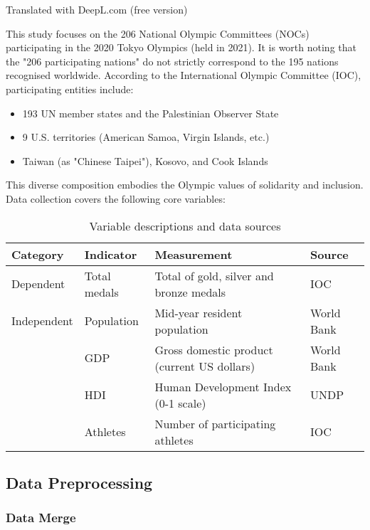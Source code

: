 \documentclass[11pt,twoside]{article}
\numberwithin{Theorem}{section}
\numberwithin{Definition}{section}
\numberwithin{Lemma}{section}
\numberwithin{Algorithm}{section}
\numberwithin{equation}{section}
\begin{document}
Translated with DeepL.com (free version)

This study focuses on the 206 National Olympic Committees (NOCs) participating in the 2020 Tokyo Olympics (held in 2021). It is worth noting that the "206 participating nations" do not strictly correspond to the 195 nations recognised worldwide. According to the International Olympic Committee (IOC), participating entities include:

\begin{itemize}
    \item 193 UN member states and the Palestinian Observer State
    \item 9 U.S. territories (American Samoa, Virgin Islands, etc.)
    \item Taiwan (as "Chinese Taipei"), Kosovo, and Cook Islands
\end{itemize}

This diverse composition embodies the Olympic values of solidarity and inclusion. Data collection covers the following core variables:

\begin{table}[!ht]
\centering
\caption{Variable descriptions and data sources}
\label{tab:variables}
\begin{tabular}{llll}
\toprule
\textbf{Category} & \textbf{Indicator} & \textbf{Measurement}  & \textbf{Source} \\
\midrule
Dependent & Total medals & Total of gold, silver and bronze medals
 & IOC\\
Independent & Population & Mid-year resident population
 & World Bank \\
 & GDP & Gross domestic product (current US dollars)& World Bank \\
 & HDI & Human Development Index (0-1 scale)& UNDP\\
 & Athletes& Number of participating athletes
 & IOC\\
\bottomrule
\end{tabular}
\end{table}


\subsection{Data Preprocessing}
\label{subsec:preprocessing}

\subsubsection{Data Merge}
\end{document}
